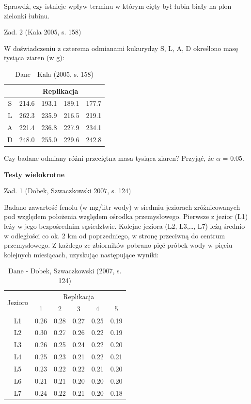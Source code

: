 \documentclass[12pt,B5paper,]{book}
\begin{document}
Sprawdź, czy istnieje wpływ terminu w którym cięty był łubin biały na
plon zielonki łubinu.

\vspace{0.8cm} Zad. 2 (Kala 2005, s. 158)

W doświadczeniu z czterema odmianami kukurydzy S, L, A, D określono masę
tysiąca ziaren (w g):

\begin{table}[H]
\centering
\caption{Dane - Kala (2005, s. 158)}
\label{kala158}
\begin{tabular}{ccccc}
\hline
& \multicolumn{4}{c}{Replikacja}   \\  \hline
S & 214.6 & 193.1 & 189.1 & 177.7 \\
L & 262.3 & 235.9 & 216.5 & 219.1 \\
A & 221.4 & 236.8 & 227.9 & 234.1 \\
D & 248.0 & 255.0 & 229.6 & 242.8 \\ \hline
\end{tabular}
\end{table}

Czy badane odmiany różni przeciętna masa tysiąca ziaren? Przyjąć, że
\(\alpha\) = 0.05.

\vspace{0.8cm}

\textbf{Testy wielokrotne}

Zad. 1 (Dobek, Szwaczkowski 2007, s. 124)

Badano zawartość fenolu (w mg/litr wody) w siedmiu jeziorach
zróżnicowanych pod względem położenia względem ośrodka przemysłowego.
Pierwsze z jezior (L1) leży w jego bezpośrednim sąsiedztwie. Kolejne
jeziora (L2, L3,\ldots{}, L7) leżą średnio w odległości co ok. 2 km od
poprzedniego, w stronę przeciwną do centrum przemysłowego. Z każdego ze
zbiorników pobrano pięć próbek wody w pięciu kolejnych miesiącach,
uzyskując następujące wyniki:

\begin{table}[H]
\centering
\caption{Dane - Dobek, Szwaczkowski (2007, s. 124)}
\label{dobek124}
\begin{tabular}{cccccc}
\hline
\multirow{2}{*}{Jezioro} & \multicolumn{5}{c}{Replikacja}   \\
                         & 1    & 2    & 3    & 4    & 5    \\ \hline
L1                       & 0.26 & 0.28 & 0.27 & 0.25 & 0.19 \\
L2                       & 0.30 & 0.27 & 0.26 & 0.22 & 0.19 \\
L3                       & 0.26 & 0.25 & 0.24 & 0.22 & 0.20 \\
L4                       & 0.25 & 0.23 & 0.21 & 0.22 & 0.21 \\
L5                       & 0.23 & 0.22 & 0.22 & 0.21 & 0.20 \\
L6                       & 0.21 & 0.21 & 0.20 & 0.20 & 0.20 \\
L7                       & 0.24 & 0.22 & 0.21 & 0.20 & 0.18 \\ \hline
\end{tabular}
\end{table}
\end{document}
